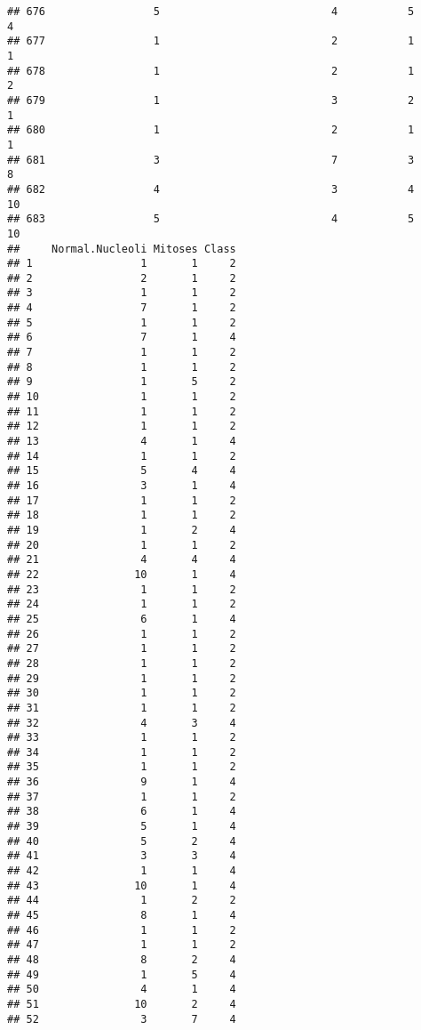 \documentclass[
]{article}
\begin{document}
\begin{verbatim}
## 676                 5                           4           5               4
## 677                 1                           2           1               1
## 678                 1                           2           1               2
## 679                 1                           3           2               1
## 680                 1                           2           1               1
## 681                 3                           7           3               8
## 682                 4                           3           4              10
## 683                 5                           4           5              10
##     Normal.Nucleoli Mitoses Class
## 1                 1       1     2
## 2                 2       1     2
## 3                 1       1     2
## 4                 7       1     2
## 5                 1       1     2
## 6                 7       1     4
## 7                 1       1     2
## 8                 1       1     2
## 9                 1       5     2
## 10                1       1     2
## 11                1       1     2
## 12                1       1     2
## 13                4       1     4
## 14                1       1     2
## 15                5       4     4
## 16                3       1     4
## 17                1       1     2
## 18                1       1     2
## 19                1       2     4
## 20                1       1     2
## 21                4       4     4
## 22               10       1     4
## 23                1       1     2
## 24                1       1     2
## 25                6       1     4
## 26                1       1     2
## 27                1       1     2
## 28                1       1     2
## 29                1       1     2
## 30                1       1     2
## 31                1       1     2
## 32                4       3     4
## 33                1       1     2
## 34                1       1     2
## 35                1       1     2
## 36                9       1     4
## 37                1       1     2
## 38                6       1     4
## 39                5       1     4
## 40                5       2     4
## 41                3       3     4
## 42                1       1     4
## 43               10       1     4
## 44                1       2     2
## 45                8       1     4
## 46                1       1     2
## 47                1       1     2
## 48                8       2     4
## 49                1       5     4
## 50                4       1     4
## 51               10       2     4
## 52                3       7     4

\end{verbatim}
\end{document}
